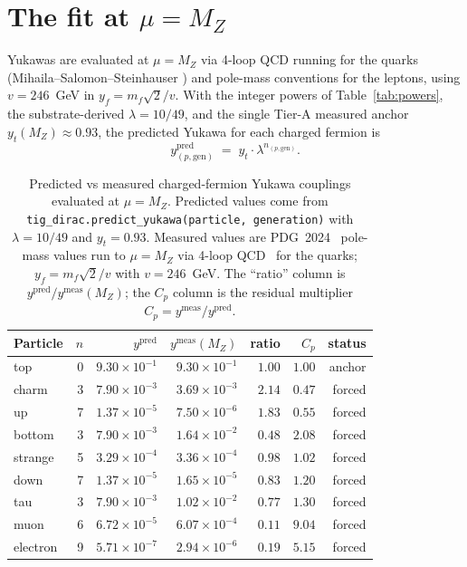 \documentclass[11pt,reqno]{amsart}
\theoremstyle{plain}
\theoremstyle{definition}
\theoremstyle{remark}
\begin{document}
\section{The fit at $\mu = M_Z$}\label{sec:fit}

Yukawas are evaluated at $\mu = M_Z$ via 4-loop QCD
running for the quarks (Mihaila--Salomon--Steinhauser
\cite{MihailaSalomonSteinhauser2012}) and pole-mass conventions
for the leptons, using $v = 246$~GeV in
$y_{f} = m_{f}\sqrt{2}/v$. With the integer powers of
Table~\ref{tab:powers}, the substrate-derived $\lambda = 10/49$,
and the single Tier-A measured anchor $y_{t}(M_Z) \approx 0.93$,
the predicted Yukawa for each charged fermion is
\[
  y_{(p,\mathrm{gen})}^{\mathrm{pred}}
  \;=\; y_{t} \cdot \lambda^{n_{(p,\mathrm{gen})}}.
\]

\begin{table}[h]
\centering
\caption{Predicted vs measured charged-fermion Yukawa couplings
evaluated at $\mu = M_Z$. Predicted values come from
\texttt{tig\_dirac.predict\_yukawa(particle, generation)} with
$\lambda = 10/49$ and $y_{t} = 0.93$. Measured values are
PDG~2024~\cite{PDG2024} pole-mass values run to $\mu = M_Z$ via
4-loop QCD~\cite{MihailaSalomonSteinhauser2012} for the
quarks; $y_{f} = m_{f}\sqrt{2}/v$ with $v = 246$~GeV. The
``ratio'' column is
$y^{\mathrm{pred}}/y^{\mathrm{meas}}(M_Z)$; the
$C_p$ column is the residual multiplier $C_p =
y^{\mathrm{meas}}/y^{\mathrm{pred}}$.}
\label{tab:fit}
\begin{tabular}{lrrrrrr}
\toprule
Particle & $n$ & $y^{\mathrm{pred}}$ & $y^{\mathrm{meas}}(M_Z)$ & ratio & $C_p$ & status \\
\midrule
top      & 0 & $9.30 \times 10^{-1}$ & $9.30 \times 10^{-1}$ & $1.00$ & $1.00$ & anchor \\
charm    & 3 & $7.90 \times 10^{-3}$ & $3.69 \times 10^{-3}$ & $2.14$ & $0.47$ & forced \\
up       & 7 & $1.37 \times 10^{-5}$ & $7.50 \times 10^{-6}$ & $1.83$ & $0.55$ & forced \\
bottom   & 3 & $7.90 \times 10^{-3}$ & $1.64 \times 10^{-2}$ & $0.48$ & $2.08$ & forced \\
strange  & 5 & $3.29 \times 10^{-4}$ & $3.36 \times 10^{-4}$ & $0.98$ & $1.02$ & forced \\
down     & 7 & $1.37 \times 10^{-5}$ & $1.65 \times 10^{-5}$ & $0.83$ & $1.20$ & forced \\
tau      & 3 & $7.90 \times 10^{-3}$ & $1.02 \times 10^{-2}$ & $0.77$ & $1.30$ & forced \\
muon     & 6 & $6.72 \times 10^{-5}$ & $6.07 \times 10^{-4}$ & $0.11$ & $9.04$ & forced \\
electron & 9 & $5.71 \times 10^{-7}$ & $2.94 \times 10^{-6}$ & $0.19$ & $5.15$ & forced \\
\bottomrule
\end{tabular}
\end{table}
\end{document}

